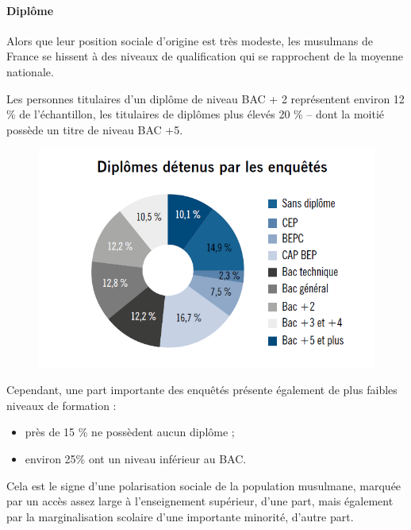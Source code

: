 \paragraph{Diplôme}


Alors que leur position sociale d'origine est très modeste, les
musulmans de France se hissent à des niveaux de qualification qui se
rapprochent de la moyenne nationale.

Les personnes titulaires d'un diplôme de niveau BAC + 2 représentent
environ 12 \% de l'échantillon, les titulaires de diplômes plus élevés
20 \% -- dont la moitié possède un titre de niveau BAC +5.
\begin{figure}
    \centering
    \includegraphics[width=\textwidth]{ImageIslamFrance/Diplome.png}
    \label{fig:my_label}
\end{figure}



Cependant, une part importante des enquêtés présente également de plus
faibles niveaux de formation :


\begin{itemize}
\item
  
  près de 15 \% ne possèdent aucun diplôme ;
  
\item
  
  environ 25\% ont un niveau inférieur au BAC.
  
\end{itemize}


Cela est le signe d'une polarisation sociale de la population musulmane,
marquée par un accès assez large à l'enseignement supérieur, d'une part,
mais également par la marginalisation scolaire d'une importante
minorité, d'autre part.


